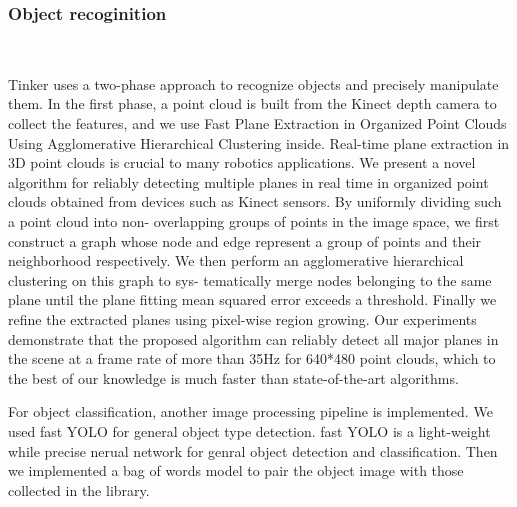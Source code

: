 \subsubsection{Object recoginition}
\ 

Tinker uses a two-phase approach to recognize objects and precisely manipulate them. In the first phase, a point cloud is built from the Kinect depth camera to collect the features, and we use Fast Plane Extraction in Organized Point Clouds Using Agglomerative Hierarchical Clustering inside.
Real-time plane extraction in 3D point clouds
is crucial to many robotics applications. We present a novel
algorithm for reliably detecting multiple planes in real time in
organized point clouds obtained from devices such as Kinect
sensors. By uniformly dividing such a point cloud into non-
overlapping groups of points in the image space, we first
construct a graph whose node and edge represent a group of
points and their neighborhood respectively. We then perform
an agglomerative hierarchical clustering on this graph to sys-
tematically merge nodes belonging to the same plane until the
plane fitting mean squared error exceeds a threshold. Finally
we refine the extracted planes using pixel-wise region growing.
Our experiments demonstrate that the proposed algorithm can
reliably detect all major planes in the scene at a frame rate of
more than 35Hz for 640*480 point clouds, which to the best of
our knowledge is much faster than state-of-the-art algorithms.

For object classification, another image processing pipeline is implemented. We used fast YOLO \cite{1612.08242} for general object type detection. fast YOLO is a light-weight while precise nerual network for genral object detection and classification. Then we implemented a bag of words model \cite{csurka2004visual} to pair the object image with those collected in the library.
